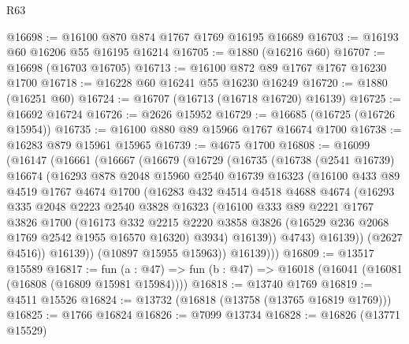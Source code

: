 \begin{lexlean}{R63}
\begin{coremodule}
@16698 := @16100 @870 @874 @1767 @1769 @16195 @16689
@16703 := @16193 @60 @16206 @55 @16195 @16214
@16705 := @1880 (@16216 @60)
@16707 := @16698 (@16703 @16705)
@16713 := @16100 @872 @89 @1767 @1767 @16230 @1700
@16718 := @16228 @60 @16241 @55 @16230 @16249
@16720 := @1880 (@16251 @60)
@16724 := @16707 (@16713 (@16718 @16720) @16139)
@16725 := @16692 @16724
@16726 := @2626 @15952
@16729 := @16685 (@16725 (@16726 @15954))
@16735 := @16100 @880 @89 @15966 @1767 @16674 @1700
@16738 := @16283 @879 @15961 @15965
@16739 := @4675 @1700
@16808 := @16099
    (@16147
      (@16661
        (@16667
          (@16679
            (@16729
              (@16735
                (@16738
                  (@2541 @16739)
                  @16674
                  (@16293
                    @878
                    @2048
                    @15960
                    @2540
                    @16739
                    @16323
                    (@16100
                      @433
                      @89
                      @4519
                      @1767
                      @4674
                      @1700
                      (@16283
                        @432
                        @4514
                        @4518
                        @4688
                        @4674
                        (@16293
                          @335
                          @2048
                          @2223
                          @2540
                          @3828
                          @16323
                          (@16100
                            @333
                            @89
                            @2221
                            @1767
                            @3826
                            @1700
                            (@16173
                              @332
                              @2215
                              @2220
                              @3858
                              @3826
                              (@16529 @236 @2068 @1769 @2542 @1955 @16570 @16320)
                              @3934)
                            @16139))
                        @4743)
                      @16139))
                  (@2627 @4516))
                @16139))
            (@10897 @15955 @15963))
          @16139)))
@16809 := @13517 @15589
@16817 := fun (a : @47) => fun (b : @47) => @16018 (@16041 (@16081 (@16808 (@16809 @15981 @15984))))
@16818 := @13740 @1769
@16819 := @4511 @15526
@16824 := @13732 (@16818 (@13758 (@13765 @16819 @1769)))
@16825 := @1766 @16824
@16826 := @7099 @13734
@16828 := @16826 (@13771 @15529)

\end{coremodule}
\end{lexlean}
